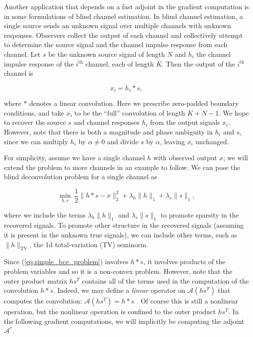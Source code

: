 \documentclass[journal]{IEEEtran}
\begin{document}
Another application that depends on a fast adjoint in the gradient computation is in some formulations of blind channel estimation.  In blind channel estimation, a single source sends an unknown signal over multiple channels with unknown responses.  Observers collect the output of each channel and collectively attempt to determine the source signal and the channel impulse response from each channel.  Let $s$ be the unknown source signal of length $N$ and $h_i$ the channel impulse response of the $i^\text{th}$ channel, each of length $K$.  Then the output of the $i^\text{th}$ channel is

\[ x_i = h_i\ast s, \] 

\noindent where $\ast$ denotes a linear convolution.  Here we prescribe zero-padded boundary conditions, and take $x_i$ to be the ``full'' convolution of length $K+N-1$.  We hope to recover the source $s$ and channel responses $h_i$ from the output signals $x_i$.   However, note that there is both a magnitude and phase ambiguity in $h_i$ and $s$, since we can multiply $h_i$ by $\alpha\neq 0$ and divide $s$ by $\alpha$, leaving $x_i$ unchanged.

For simplicity, assume we have a single channel $h$ with observed output $x$; we will extend the problem to more channels in an example to follow.  We can pose the blind deconvolution problem for a single channel as

\begin{equation}
\label{eq:simple_bce_problem}
\min_{h,s}~ \frac{1}{2}\|h\ast s-x\|_2^2 + \lambda_h\|h\|_1 + \lambda_s \|s\|_1,
\end{equation}

\noindent where we include the terms $\lambda_h\|h\|_1$ and $\lambda_s\|s\|_1$ to promote sparsity in the recovered signals.  To promote other structure in the recovered signals (assuming it is present in the unknown true signals), we can include other terms, such as $\|h\|_\text{TV}$, the 1d total-variation (TV) seminorm.

Since (\ref{eq:simple_bce_problem}) involves $h\ast s$, it involves products of the problem variables and so it is a non-convex problem.  However, note that the outer product matrix $hs^T$ contains all of the terms used in the computation of the convolution $h\ast s$.  Indeed, we may define a \emph{linear} operator on $\mathcal{A}(hs^T)$ that computes the convolution: $\mathcal{A}(hs^T)=h\ast s$ \cite{ahmed_2013}.  Of course this is still a nonlinear operation, but the nonlinear operation is confined to the outer product $hs^T$.  In the following gradient computations, we will implicitly be computing the adjoint $\mathcal{A}^\ast$.
\end{document}
